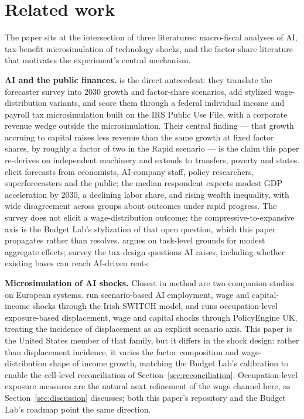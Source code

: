 \section{Related work}\label{sec:literature}

The paper sits at the intersection of three literatures: macro-fiscal
analyses of AI, tax-benefit microsimulation of technology shocks, and the
factor-share literature that motivates the experiment's central mechanism.

\textbf{AI and the public finances.} \citet{iselinnunn2026} is the direct
antecedent: they translate the \citet{karger2026} forecaster survey into
2030 growth and factor-share scenarios, add stylized wage-distribution
variants, and score them through a federal individual income and payroll tax
microsimulation built on the IRS Public Use File, with a corporate revenue
wedge outside the microsimulation. Their central finding --- that growth
accruing to capital raises less revenue than the same growth at fixed factor
shares, by roughly a factor of two in the Rapid scenario --- is the claim
this paper re-derives on independent machinery and extends to transfers,
poverty and states. \citet{karger2026} elicit forecasts from economists,
AI-company staff, policy researchers, superforecasters and the public; the
median respondent expects modest GDP acceleration by 2030, a declining labor
share, and rising wealth inequality, with wide disagreement across groups
about outcomes under rapid progress. The survey does not elicit a
wage-distribution outcome; the compressive-to-expansive axis is the Budget
Lab's stylization of that open question, which this paper propagates rather
than resolves. \citet{acemoglu2025} argues on task-level grounds for modest
aggregate effects; \citet{bastani2024} survey the tax-design questions AI
raises, including whether existing bases can reach AI-driven rents.

\textbf{Microsimulation of AI shocks.} Closest in method are two companion
studies on European systems. \citet{doorley2026} run scenario-based AI
employment, wage and capital-income shocks through the Irish SWITCH model,
and
\citet{ahmadi2026} runs occupation-level exposure-based displacement, wage and
capital shocks through PolicyEngine UK, treating the incidence of
displacement as an explicit scenario axis. This paper is the United States
member of that family, but it differs in the shock design: rather than
displacement incidence, it varies the factor composition and
wage-distribution shape of income growth, matching the Budget Lab's
calibration to enable the cell-level reconciliation of
Section~\ref{sec:reconciliation}. Occupation-level exposure measures
\citep{felten2021, eloundou2024} are the natural next refinement of the wage
channel here, as Section~\ref{sec:discussion} discusses; both this paper's
repository and the Budget Lab's roadmap point the same direction.

